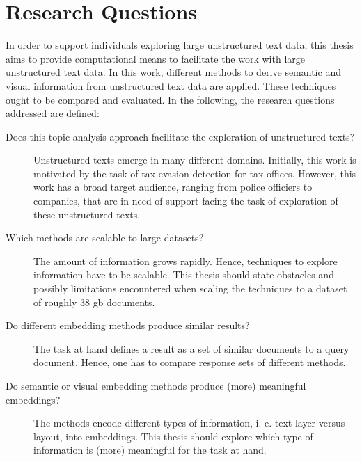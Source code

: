 \section{Research Questions}\label{sec:research-questions}

In order to support individuals exploring large unstructured text data, 
this thesis aims to provide computational means to facilitate the work with large unstructured text data.
In this work, different methods to derive semantic and visual information from unstructured text data are applied.
These techniques ought to be compared and evaluated.
In the following, the research questions addressed are defined:
\begin{description}
    \item[Does this topic analysis approach facilitate the exploration of unstructured texts?]
    Unstructured texts emerge in many different domains.
    Initially, this work is motivated by the task of tax evasion detection for tax offices.
    However, this work has a broad target audience, ranging from police officiers to companies, 
    that are in need of support facing the task of exploration of these unstructured texts.

    \item[Which methods are scalable to large datasets?]
    The amount of information grows rapidly.
    Hence, techniques to explore information have to be scalable.
    This thesis should state obstacles and possibly limitations encountered when scaling the techniques to a dataset of roughly 38 \ac{gb} documents.

    \item[Do different embedding methods produce similar results?]
    The task at hand defines a result as a set of similar documents to a query document.
    Hence, one has to compare response sets of different methods.

    \item[Do semantic or visual embedding methods produce (more) meaningful embeddings?]
    The methods encode different types of information, i. e. text layer versus layout, into embeddings. 
    This thesis should explore which type of information is (more) meaningful for the task at hand.


\end{description}

